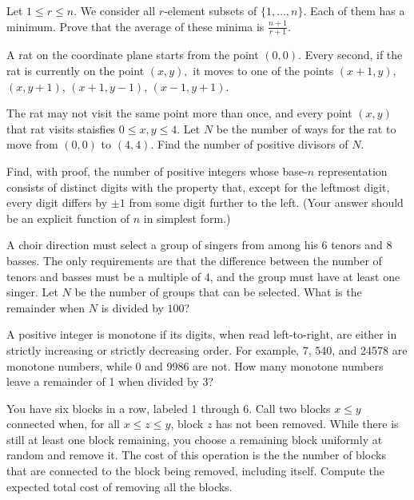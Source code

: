 \documentclass{article}
\begin{document}
\vspace{0.2cm}

\begin{prob}[IMO 1981/2]{6}
Let $1\leq r\leq n.$ We consider all $r$-element subsets of $\{1,\ldots,n\}.$ Each of them has a minimum. Prove that the average of these minima is $\frac{n+1}{r+1}.$
\end{prob}

\begin{prob}[CIME II 2021/6]{6}
A rat on the coordinate plane starts from the point $(0,0).$ Every second, if the rat is currently on the point $(x,y),$ it moves to one of the points $(x+1,y)$, $(x,y+1)$, $(x+1,y-1)$, $(x-1,y+1).$

\noindent The rat may not visit the same point more than once, and every point $(x,y)$ that rat visits staisfies $0\leq x, y\leq 4.$ Let $N$ be the number of ways for the rat to move from $(0,0)$ to $(4,4).$ Find the number of positive divisors of $N.$
\end{prob}

\begin{prob}[USAMO 1990/4]{9}
Find, with proof, the number of positive integers whose base-$n$ representation consists of distinct digits with the property that, except for the leftmost digit, every digit differs by $\pm 1$ from some digit further to the left. (Your answer should be an explicit function of $n$ in simplest form.)
\end{prob}

\begin{req}[AMC 12A 2021/15]{9}
A choir direction must select a group of singers from among his $6$ tenors and $8$ basses. The only requirements are that the difference between the number of tenors and basses must be a multiple of $4$, and the group must have at least one singer. Let $N$ be the number of groups that can be selected. What is the remainder when $N$ is divided by $100$?
\end{req}

    
    \begin{prob}{13}
A positive integer is monotone if its digits, when read left-to-right, are either in strictly increasing or strictly decreasing order. For example, 7, 540, and 24578 are monotone numbers, while 0 and 9986 are not. How many monotone numbers leave a remainder of 1 when divided by 3?
\end{prob}
    
    \begin{prob}{13}
You have six blocks in a row, labeled 1 through 6. Call two blocks $x \le y$
    connected when, for all $x \le z \le y$, block $z$ has not been removed. While there is still at least one block remaining, you choose a remaining block uniformly at random and remove it. The cost of this operation is the the number of blocks that are connected to the block being removed, including itself. Compute the expected total cost of removing all the blocks.
\end{prob}
\end{document}
